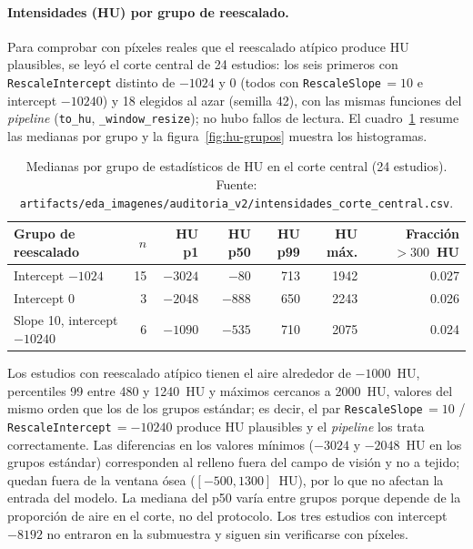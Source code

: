 \paragraph{Intensidades (HU) por grupo de reescalado.} Para comprobar con p\'ixeles reales que el reescalado at\'ipico produce HU plausibles, se ley\'o el corte central de 24 estudios: los seis primeros con \texttt{RescaleIntercept} distinto de $-1024$ y $0$ (todos con \texttt{RescaleSlope}\,$=10$ e intercept $-10240$) y 18 elegidos al azar (semilla 42), con las mismas funciones del \emph{pipeline} (\texttt{to\_hu}, \texttt{\_window\_resize}); no hubo fallos de lectura. El cuadro~\ref{tab:hu-grupos} resume las medianas por grupo y la figura~\ref{fig:hu-grupos} muestra los histogramas.

\begin{table}[H]\centering\small
\begin{tabular}{lrrrrrr}\toprule
Grupo de reescalado & $n$ & HU p1 & HU p50 & HU p99 & HU m\'ax. & Fracci\'on $>300$~HU \\\midrule
Intercept $-1024$ & 15 & $-3024$ & $-80$ & 713 & 1942 & 0.027 \\
Intercept $0$ & 3 & $-2048$ & $-888$ & 650 & 2243 & 0.026 \\
Slope 10, intercept $-10240$ & 6 & $-1090$ & $-535$ & 710 & 2075 & 0.024 \\\bottomrule
\end{tabular}
\caption{Medianas por grupo de estad\'isticos de HU en el corte central (24 estudios). Fuente: \texttt{artifacts/eda\_imagenes/auditoria\_v2/intensidades\_corte\_central.csv}.}\label{tab:hu-grupos}
\end{table}

Los estudios con reescalado at\'ipico tienen el aire alrededor de $-1000$~HU, percentiles 99 entre 480 y 1240~HU y m\'aximos cercanos a 2000~HU, valores del mismo orden que los de los grupos est\'andar; es decir, el par \texttt{RescaleSlope}\,$=10$ / \texttt{RescaleIntercept}\,$=-10240$ produce HU plausibles y el \emph{pipeline} los trata correctamente. Las diferencias en los valores m\'inimos ($-3024$ y $-2048$~HU en los grupos est\'andar) corresponden al relleno fuera del campo de visi\'on y no a tejido; quedan fuera de la ventana \'osea ($[-500,1300]$~HU), por lo que no afectan la entrada del modelo. La mediana del p50 var\'ia entre grupos porque depende de la proporci\'on de aire en el corte, no del protocolo. Los tres estudios con intercept $-8192$ no entraron en la submuestra y siguen sin verificarse con p\'ixeles.

